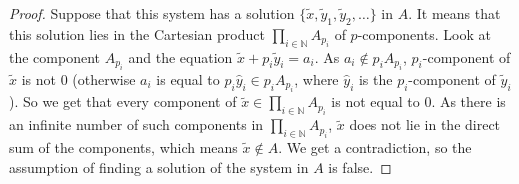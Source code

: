 \documentclass[10pt,a4paper]{amsart}
\begin{document}
\begin{proof}
Suppose that this system has a solution $\{\tilde x, \tilde y_1, \tilde y_2, \ldots\}$
in $A$. It means that this solution lies in the Cartesian product
$\prod\limits_{i \in \mathbb N} A_{p_i}$ of $p$-components.
Look at the component $A_{p_i}$ and the equation $\tilde x + p_i \tilde y_i = a_i$.
As $a_i \notin p_i A_{p_i}$, $p_i$-component of $\tilde x$
is not $0$ (otherwise $a_i$ is equal to $p_i \hat y_i \in p_iA_{p_i}$, where
$\hat y_i$ is the $p_i$-component of $\tilde y_i$).
So we get that every component of $\tilde x\in\prod\limits_{i \in \mathbb N} A_{p_i}$
is not equal to $0$.
As there is an infinite number of such components in $\prod\limits_{i \in \mathbb N} A_{p_i}$,
$\tilde x$ does not lie in the direct sum of the components, which means $\tilde x \notin A$.
We get a contradiction, so the assumption of finding a solution
of the system in $A$ is false.
\end{proof}
\end{document}
